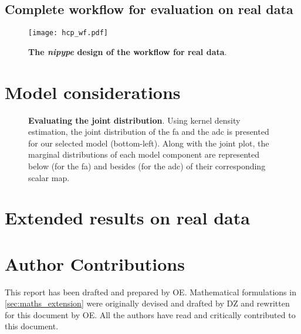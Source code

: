 \documentclass[a4paper]{report}
\begin{document}
\subsection{Complete workflow for evaluation on real data}
\begin{figure}[!ht]
  \texttt{[image: hcp\_wf.pdf]}
  \caption{\textbf{The \emph{nipype} design of the workflow for real data}.}\label{fig:wf_hcp}
\end{figure}

\clearpage
\section{Model considerations}

%   

\begin{figure}[!ht]
  \centering
  \captionsetup{format=overlay}
  \caption{\textbf{Evaluating the joint distribution}.
  Using kernel density estimation, the joint distribution of the \gls*{fa} and the \gls{adc}
    is presented for our selected model (bottom-left).
  Along with the joint plot, the marginal distributions of each model component
    are represented below (for the \gls*{fa}) and besides (for the \gls*{adc}) of their corresponding
    scalar map.}
  \label{fig:jointplot}
\end{figure}

\clearpage
\section{Extended results on real data}

\immediate{}


\clearpage
\section*{Author Contributions}
This report has been drafted and prepared by OE.
Mathematical formulations in \autoref{sec:maths_extension} were originally devised and drafted
  by DZ and rewritten for this document by OE.
All the authors have read and critically contributed to this document.



\end{document}
